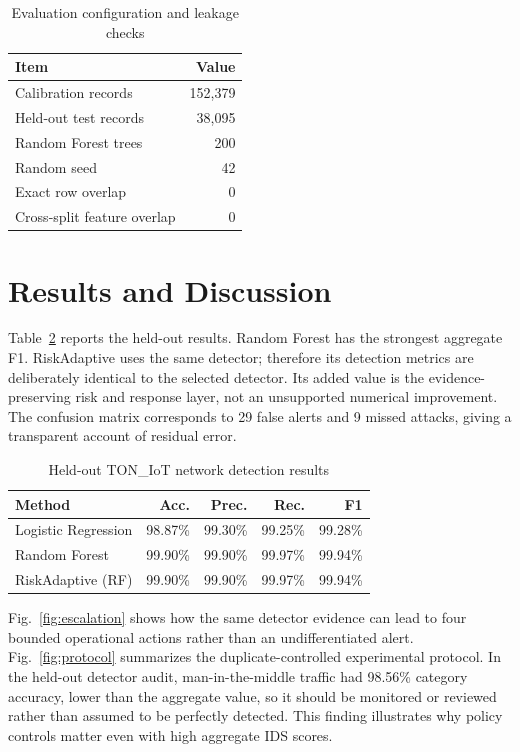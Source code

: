\documentclass[conference]{IEEEtran}
\begin{document}
\begin{table}[!t]
\caption{Evaluation configuration and leakage checks}
\label{tab:setup}
\centering\footnotesize
\begin{tabular}{p{3.2cm}r}
\toprule
\textbf{Item} & \textbf{Value}\\
\midrule
Calibration records & 152,379\\
Held-out test records & 38,095\\
Random Forest trees & 200\\
Random seed & 42\\
Exact row overlap & 0\\
Cross-split feature overlap & 0\\
\bottomrule
\end{tabular}
\end{table}

\section{Results and Discussion}
Table~\ref{tab:results} reports the held-out results. Random Forest has the strongest aggregate F1. RiskAdaptive uses the same detector; therefore its detection metrics are deliberately identical to the selected detector. Its added value is the evidence-preserving risk and response layer, not an unsupported numerical improvement. The confusion matrix corresponds to 29 false alerts and 9 missed attacks, giving a transparent account of residual error.

\begin{table}[!t]
\caption{Held-out TON\_IoT network detection results}
\label{tab:results}
\centering\footnotesize
\begin{tabular}{lrrrr}
\toprule
\textbf{Method} & \textbf{Acc.} & \textbf{Prec.} & \textbf{Rec.} & \textbf{F1}\\
\midrule
Logistic Regression & 98.87\% & 99.30\% & 99.25\% & 99.28\%\\
Random Forest & 99.90\% & 99.90\% & 99.97\% & 99.94\%\\
RiskAdaptive (RF) & 99.90\% & 99.90\% & 99.97\% & 99.94\%\\
\bottomrule
\end{tabular}
\end{table}

Fig.~\ref{fig:escalation} shows how the same detector evidence can lead to four bounded operational actions rather than an undifferentiated alert. Fig.~\ref{fig:protocol} summarizes the duplicate-controlled experimental protocol. In the held-out detector audit, man-in-the-middle traffic had 98.56\% category accuracy, lower than the aggregate value, so it should be monitored or reviewed rather than assumed to be perfectly detected. This finding illustrates why policy controls matter even with high aggregate IDS scores.
\end{document}
